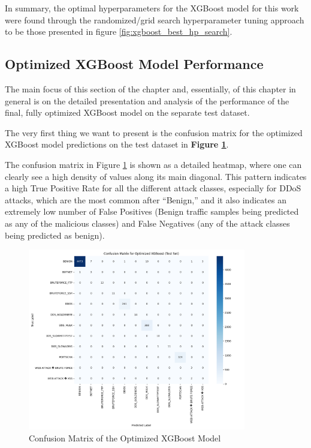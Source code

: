 In summary, the optimal hyperparameters for the XGBoost model for this work were found through the randomized/grid search hyperparameter tuning approach to be those presented in figure \ref{fig:xgboost_best_hp_search}.

\subsection{Optimized XGBoost Model Performance}

The main focus of this section of the chapter and, essentially, of this chapter in general is on the detailed presentation and analysis of the performance of the final, fully optimized XGBoost model on the separate test dataset.

The very first thing we want to present is the confusion matrix for the optimized XGBoost model predictions on the test dataset in \textbf{Figure \ref{fig:confusion_matrix_xgboost}}.

The confusion matrix in Figure \ref{fig:confusion_matrix_xgboost} is shown as a detailed heatmap, where one can clearly see a high density of values along its main diagonal. This pattern indicates a high True Positive Rate for all the different attack classes, especially for DDoS attacks, which are the most common after “Benign,” and it also indicates an extremely low number of False Positives (Benign traffic samples being predicted as any of the malicious classes) and False Negatives (any of the attack classes being predicted as benign).

\begin{figure}[H]
	\centering
	\includegraphics[width=0.85\textwidth]{assets/figures/results/confusion_matrix_xgboost.png}
	\caption{Confusion Matrix of the Optimized XGBoost Model}
	\label{fig:confusion_matrix_xgboost}
\end{figure}


